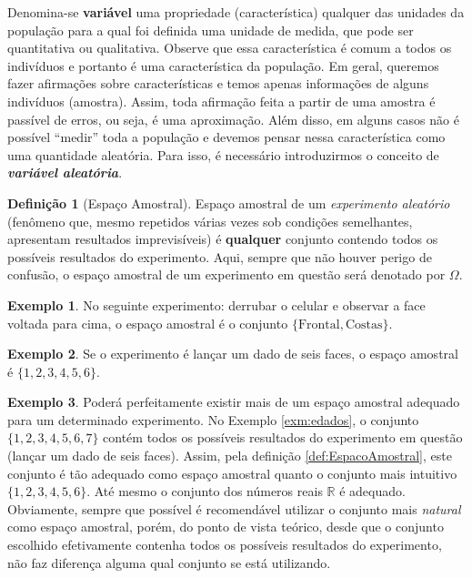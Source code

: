 \documentclass[
]{book}
\theoremstyle{definition}
\newtheorem{definition}{Definição}[chapter]
\theoremstyle{definition}
\newtheorem{example}{Exemplo}[chapter]
\theoremstyle{definition}
\theoremstyle{remark}
\begin{document}
Denomina-se \textbf{variável} uma propriedade (característica) qualquer das unidades da população para a qual foi definida uma unidade de medida, que pode ser quantitativa ou qualitativa. Observe que essa característica é comum a todos os indivíduos e portanto é uma característica da população. Em geral, queremos fazer afirmações sobre características e temos apenas informações de alguns indivíduos (amostra). Assim, toda afirmação feita a partir de uma amostra é passível de erros, ou seja, é uma
aproximação. Além disso, em alguns casos não é possível ``medir'' toda a população e devemos pensar nessa característica como uma quantidade aleatória. Para isso, é necessário introduzirmos o
conceito de \emph{\textbf{variável aleatória}}.

\begin{definition}[Espaço Amostral]
\protect\hypertarget{def:EspacoAmostral}{}{\label{def:EspacoAmostral} {} }Espaço amostral de um \emph{experimento aleatório} (fenômeno que, mesmo repetidos várias vezes sob condições semelhantes, apresentam resultados imprevisíveis) é \textbf{qualquer} conjunto contendo todos os possíveis resultados do experimento. Aqui, sempre que não houver perigo de confusão, o espaço amostral de um experimento em questão será denotado por \(\Omega\).
\end{definition}

\begin{example}
\protect\hypertarget{exm:exampcel}{}{\label{exm:exampcel} }No seguinte experimento: derrubar o celular e observar a face voltada para cima, o espaço amostral é o conjunto \(\{\mathrm{Frontal}, \mathrm{Costas}\}\).
\end{example}

\begin{example}
\protect\hypertarget{exm:edados}{}{\label{exm:edados} }Se o experimento é lançar um dado de seis faces, o espaço amostral é \(\{1,2,3,4,5,6\}\).
\end{example}

\begin{example}
\protect\hypertarget{exm:exampespamost}{}{\label{exm:exampespamost} }Poderá perfeitamente existir mais de um espaço amostral adequado para um determinado experimento. No Exemplo \ref{exm:edados}, o conjunto \(\{1,2,3,4,5,6,7\}\) contém todos os possíveis resultados do experimento em questão (lançar um dado de seis faces). Assim, pela definição \ref{def:EspacoAmostral}, este conjunto é tão adequado como espaço amostral quanto o conjunto mais intuitivo \(\{1,2,3,4,5,6\}\). Até mesmo o conjunto dos números reais \(\mathbb{R}\) é adequado. Obviamente, sempre que possível é recomendável utilizar o conjunto mais \emph{natural} como espaço amostral, porém, do ponto de vista teórico, desde que o conjunto escolhido efetivamente contenha todos os possíveis resultados do experimento, não faz diferença alguma qual conjunto se está utilizando.
\end{example}
\end{document}
